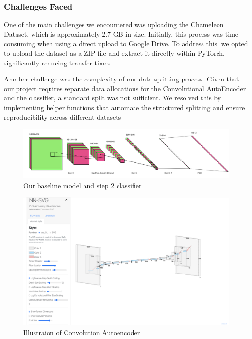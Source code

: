 \documentclass{article} %
\begin{document}
\subsubsection{Challenges Faced}
One of the main challenges we encountered was uploading the Chameleon Dataset, which is approximately 2.7 GB in size. Initially, this process was time-consuming when using a direct upload to Google Drive. To address this, we opted to upload the dataset as a ZIP file and extract it directly within PyTorch, significantly reducing transfer times.

Another challenge was the complexity of our data splitting process. Given that our project requires separate data allocations for the Convolutional AutoEncoder and the classifier, a standard split was not sufficient. We resolved this by implementing helper functions that automate the structured splitting and ensure reproducibility across different datasets

\begin{figure}[h]
    \centering
    \includegraphics[width=1\textwidth]{figs/baseline.png}
    \caption{Our baseline model and step 2 classifier}
    \label{fig: baseline}
\end{figure}

\begin{figure}[h]
    \centering
    \includegraphics[width=1\textwidth]{figs/cae_illustration.png}
    \caption{Illustraion of Convolution Autoencoder}
    \label{fig:cae}
\end{figure}
\end{document}
